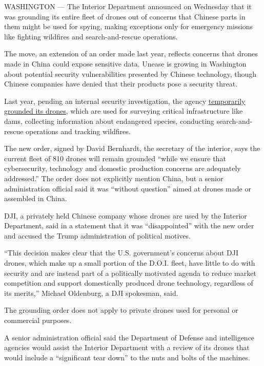 WASHINGTON --- The Interior Department announced on Wednesday that it
was grounding its entire fleet of drones out of concerns that Chinese
parts in them might be used for spying, making exceptions only for
emergency missions like fighting wildfires and search-and-rescue
operations.

The move, an extension of an order made last year, reflects concerns
that drones made in China could expose sensitive data. Unease is growing
in Washington about potential security vulnerabilities presented by
Chinese technology, though Chinese companies have denied that their
products pose a security threat.

Last year, pending an internal security investigation, the agency
\href{https://www.nytimes3xbfgragh.onion/2019/10/30/us/politics/interior-department-chinese-made-drones.html}{temporarily
grounded its drones}, which are used for surveying critical
infrastructure like dams, collecting information about endangered
species, conducting search-and-rescue operations and tracking wildfires.

The new order, signed by David Bernhardt, the secretary of the interior,
says the current fleet of 810 drones will remain grounded ``while we
ensure that cybersecurity, technology and domestic production concerns
are adequately addressed.'' The order does not explicitly mention China,
but a senior administration official said it was ``without question''
aimed at drones made or assembled in China.

DJI, a privately held Chinese company whose drones are used by the
Interior Department, said in a statement that it was ``disappointed''
with the new order and accused the Trump administration of political
motives.

``This decision makes clear that the U.S. government's concerns about
DJI drones, which make up a small portion of the D.O.I. fleet, have
little to do with security and are instead part of a politically
motivated agenda to reduce market competition and support domestically
produced drone technology, regardless of its merits,'' Michael
Oldenburg, a DJI spokesman, said.

The grounding order does not apply to private drones used for personal
or commercial purposes.

A senior administration official said the Department of Defense and
intelligence agencies would assist the Interior Department with a review
of its drones that would include a ``significant tear down'' to the nuts
and bolts of the machines.

